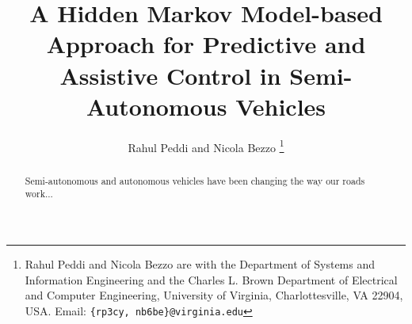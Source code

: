 \documentclass[letterpaper, 10 pt, conference]{ieeeconf}  %
\begin{document}
%
\title{\LARGE \bf A Hidden Markov Model-based Approach for Predictive and Assistive Control in Semi-Autonomous Vehicles}
\author{Rahul Peddi and Nicola Bezzo%
\thanks{Rahul Peddi and Nicola Bezzo are with the Department of Systems and Information Engineering and the Charles L. Brown Department of Electrical and Computer Engineering, University of Virginia, Charlottesville, VA 22904, USA. Email: {\tt \{rp3cy, nb6be\}@virginia.edu}}
}





\maketitle

\begin{abstract}
 Semi-autonomous and autonomous vehicles have been changing the way our roads work...
\end{abstract}





%
\IEEEpeerreviewmaketitle
\end{document}
